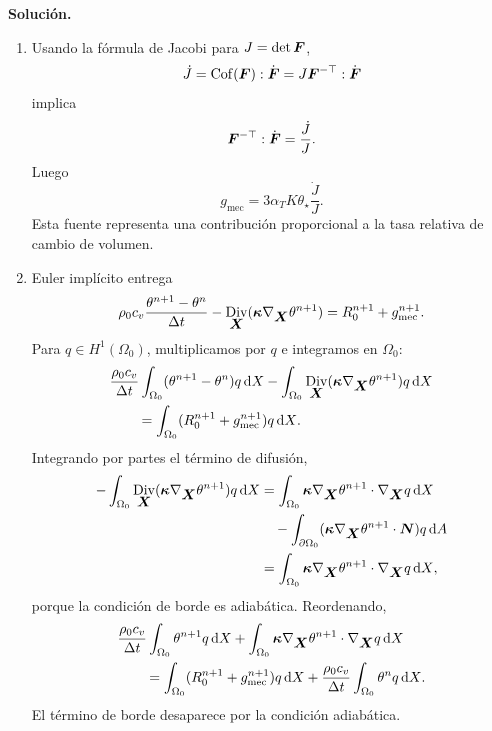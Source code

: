 \documentclass[11pt]{article}
\def\vec   #1{\mbox{\boldmath $#1$}{}}
\def\ten   #1{\mbox{\boldmath $#1$}{}}
\def\dX{\mbox{\(\,\mathrm{d}X\)}}
\def\dA{\mbox{\(\,\mathrm{d}A\)}}
\DeclareMathOperator{\Div}{Div}
\DeclareMathOperator{\Cof}{Cof}
\begin{document}
\begin{enumerate}[label=\textbf{\arabic*.}, leftmargin=*]
    \textbf{Solución.}
    \begin{enumerate}[label=(\alph*)]
        \item Usando la fórmula de Jacobi para $J=\det\ten F$,
        \[
            \dot J=\Cof(\ten F):\dot{\ten F}
            =
            J\ten F^{-\top}:\dot{\ten F}
        \]
        implica
        \[
            \ten F^{-\top}:\dot{\ten F}=\frac{\dot J}{J}.
        \]
        Luego
        \[
            g_{\mathrm{mec}}
            =
            3\alpha_TK\theta_\star\frac{\dot J}{J}.
        \]
        Esta fuente representa una contribución proporcional a la tasa relativa de cambio de volumen.

        \item Euler implícito entrega
        \[
            \rho_0c_v\frac{\theta^{n+1}-\theta^n}{\Delta t}
            -\Div_{\vec X}(\ten\kappa\nabla_{\vec X}\theta^{n+1})
            =
            R_0^{n+1}+g_{\mathrm{mec}}^{n+1}.
        \]
        Para $q\in H^1(\Omega_0)$, multiplicamos por $q$ e integramos en $\Omega_0$:
        \[
        \begin{aligned}
            &\frac{\rho_0c_v}{\Delta t}
            \int_{\Omega_0}(\theta^{n+1}-\theta^n)q\dX
            -\int_{\Omega_0}
            \Div_{\vec X}(\ten\kappa\nabla_{\vec X}\theta^{n+1})q\dX\\
            &\qquad=
            \int_{\Omega_0}
            (R_0^{n+1}+g_{\mathrm{mec}}^{n+1})q\dX.
        \end{aligned}
        \]
        Integrando por partes el término de difusión,
        \[
        \begin{aligned}
            -\int_{\Omega_0}
            \Div_{\vec X}(\ten\kappa\nabla_{\vec X}\theta^{n+1})q\dX
            &=
            \int_{\Omega_0}
            \ten\kappa\nabla_{\vec X}\theta^{n+1}\cdot\nabla_{\vec X}q\dX\\
            &\quad
            -\int_{\partial\Omega_0}
            (\ten\kappa\nabla_{\vec X}\theta^{n+1}\cdot\vec N)q\dA\\
            &=
            \int_{\Omega_0}
            \ten\kappa\nabla_{\vec X}\theta^{n+1}\cdot\nabla_{\vec X}q\dX,
        \end{aligned}
        \]
        porque la condición de borde es adiabática. Reordenando,
        \[
        \begin{aligned}
            &\frac{\rho_0c_v}{\Delta t}\int_{\Omega_0}\theta^{n+1}q\dX
            +\int_{\Omega_0}\ten\kappa\nabla_{\vec X}\theta^{n+1}\cdot\nabla_{\vec X}q\dX\\
            &\qquad=
            \int_{\Omega_0}(R_0^{n+1}+g_{\mathrm{mec}}^{n+1})q\dX
            +\frac{\rho_0c_v}{\Delta t}\int_{\Omega_0}\theta^nq\dX.
        \end{aligned}
        \]
        El término de borde desaparece por la condición adiabática.


\end{enumerate}
\end{enumerate}
\end{document}
